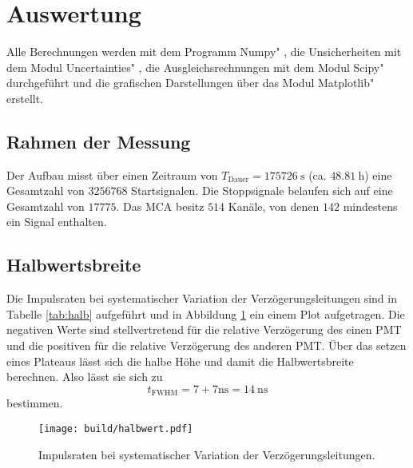 \section{Auswertung}
\label{sec:Auswertung}
Alle Berechnungen werden mit dem Programm \glqq Numpy" \cite{numpy}, die Unsicherheiten mit dem Modul \glqq Uncertainties" \cite{uncertainties}, die Ausgleichsrechnungen mit dem Modul \glqq Scipy" \cite{scipy} durchgeführt und die grafischen Darstellungen über das Modul \glqq Matplotlib" \cite{matplotlib} erstellt.


\subsection{Rahmen der Messung}
Der Aufbau misst über einen Zeitraum von $T_\text{Dauer} = \SI{175726}{\s}$ (ca. $\SI{48.81}{\hour}$) eine Gesamtzahl von $\num{3256768}$ Startsignalen. Die Stoppsignale belaufen sich auf eine Gesamtzahl von $\num{17775}$. Das MCA besitz $\num{514}$ Kanäle, von denen $\num{142}$ mindestens ein Signal enthalten.  


\subsection{Halbwertsbreite}

Die Impulsraten bei systematischer Variation der Verzögerungsleitungen sind in Tabelle \ref{tab:halb} aufgeführt und in Abbildung \ref{fig:halb} ein einem Plot aufgetragen. Die negativen Werte sind stellvertretend für die relative Verzögerung des einen PMT und die positiven für die relative Verzögerung des anderen PMT. Über das setzen eines Plateaus lässt sich die halbe Höhe und damit die Halbwertsbreite berechnen.
Also lässt sie sich zu
\begin{equation}
    t_\text{FWHM} = 7+7 \si{\nano\s} = \SI{14}{\nano\s}
\end{equation}
bestimmen.


\begin{figure}[h]
    \centering
    \texttt{[image: build/halbwert.pdf]}
    \caption{Impulsraten bei systematischer Variation der Verzögerungsleitungen.}
    \label{fig:halb}
\end{figure}

